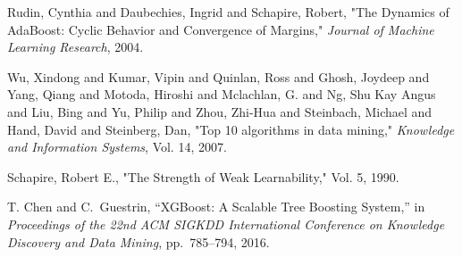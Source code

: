 \documentclass[conference]{IEEEtran}
\begin{document}
\begin{thebibliography}{1}
Rudin, Cynthia and Daubechies, Ingrid and Schapire, Robert,
 "The Dynamics of AdaBoost: Cyclic Behavior and Convergence of Margins,"
 {\em Journal of Machine Learning Research}, 2004.
 
Wu, Xindong and Kumar, Vipin and Quinlan, Ross and Ghosh, Joydeep and Yang, Qiang and Motoda, Hiroshi and Mclachlan, G. and Ng, Shu Kay Angus and Liu, Bing and Yu, Philip and Zhou, Zhi-Hua and Steinbach, Michael and Hand, David and Steinberg, Dan,
"Top 10 algorithms in data mining," {\em {Knowledge and Information Systems}}, Vol. 14, 2007.

Schapire, Robert E.,
"The Strength of Weak Learnability," Vol. 5, 1990. 

T. {Chen} and C.~{Guestrin}, ``XGBoost: A Scalable Tree Boosting System,'' in
{\em Proceedings of the 22nd ACM SIGKDD International Conference on Knowledge Discovery and Data Mining}, pp.~785--794, 2016.
   
\end{thebibliography}

% 
%
%
\end{document}

